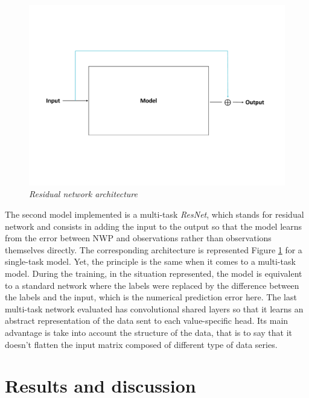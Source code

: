 \documentclass{article}
\newcommand{\saut}{\vspace{10px}}
\begin{document}

\vspace{-30px}

\begin{figure}[H]
    \centering
    \includegraphics[width=.9\linewidth]{img/residual.pdf}
    \vspace{-30px}
    \caption{\textit{Residual network architecture}}
    \label{fig:Fig. 3}
\end{figure}

\saut

The second model implemented is a multi-task \emph{ResNet}, which stands for residual network and consists in adding
the input to the output so that the model learns from the error between NWP and observations rather than observations
themselves directly. The corresponding architecture is represented Figure \ref{fig:Fig. 3} for a single-task model. Yet,
the principle is the same when it comes to a multi-task model. During the training, in the situation represented,
the model is equivalent to a standard network where the labels were replaced by the difference between the
labels and the input, which is the numerical prediction error here.
The last multi-task network evaluated has convolutional shared layers so that it learns an abstract representation of the
data sent to each value-specific head. Its main advantage is take into account the structure of the data, that is to say
that it doesn't flatten the input matrix composed of different type of data series.


\section{Results and discussion}
\end{document}
